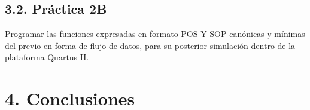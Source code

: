 \documentclass[letterpaper]{article} %
\begin{document}
                \begin{figure}[H]
                    \raggedright
                \end{figure}

                \begin{figure}[H]
                    \raggedright
                \end{figure}

                                

        \subsection*{3.2. Pr\'actica 2B}
        Programar las funciones expresadas en formato POS Y SOP can\'onicas y m\'inimas del previo
        en forma de flujo de datos, para su posterior simulación dentro de la plataforma Quartus II.

        

    \section*{4. Conclusiones}

    
\end{document}
